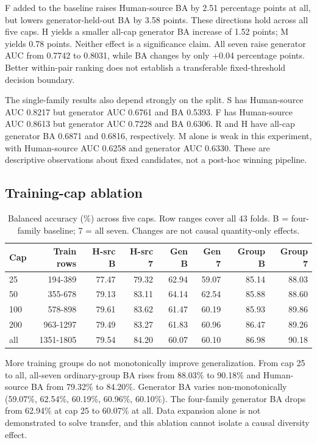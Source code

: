 F added to the baseline raises Human-source BA by 2.51 percentage points at all, but lowers generator-held-out BA by 3.58 points. These directions hold across all five caps. H yields a smaller all-cap generator BA increase of 1.52 points; M yields 0.78 points. Neither effect is a significance claim. All seven raise generator AUC from 0.7742 to 0.8031, while BA changes by only +0.04 percentage points. Better within-pair ranking does not establish a transferable fixed-threshold decision boundary.

The single-family results also depend strongly on the split. S has Human-source AUC 0.8217 but generator AUC 0.6761 and BA 0.5393. F has Human-source AUC 0.8613 but generator AUC 0.7228 and BA 0.6306. R and H have all-cap generator BA 0.6871 and 0.6816, respectively. M alone is weak in this experiment, with Human-source AUC 0.6258 and generator AUC 0.6330. These are descriptive observations about fixed candidates, not a post-hoc winning pipeline.

\subsection{Training-cap ablation}

\begin{table}[htbp]
\centering\small
\begin{tabular}{@{}lrrrrrrr@{}}
\toprule
Cap & Train rows & H-src B & H-src 7 & Gen B & Gen 7 & Group B & Group 7 \\
\midrule
25 & 194-389 & 77.47 & 79.32 & 62.94 & 59.07 & 85.14 & 88.03 \\
50 & 355-678 & 79.13 & 83.11 & 64.14 & 62.54 & 85.88 & 88.60 \\
100 & 578-898 & 79.61 & 83.62 & 61.47 & 60.19 & 85.93 & 89.86 \\
200 & 963-1297 & 79.49 & 83.27 & 61.83 & 60.96 & 86.47 & 89.26 \\
all & 1351-1805 & 79.54 & 84.20 & 60.07 & 60.10 & 86.98 & 90.18 \\
\bottomrule
\end{tabular}
\caption{Balanced accuracy (\%) across five caps. Row ranges cover all 43 folds. B = four-family baseline; 7 = all seven. Changes are not causal quantity-only effects.}
\end{table}

More training groups do not monotonically improve generalization. From cap 25 to all, all-seven ordinary-group BA rises from 88.03\% to 90.18\% and Human-source BA from 79.32\% to 84.20\%. Generator BA varies non-monotonically (59.07\%, 62.54\%, 60.19\%, 60.96\%, 60.10\%). The four-family generator BA drops from 62.94\% at cap 25 to 60.07\% at all. Data expansion alone is not demonstrated to solve transfer, and this ablation cannot isolate a causal diversity effect.

